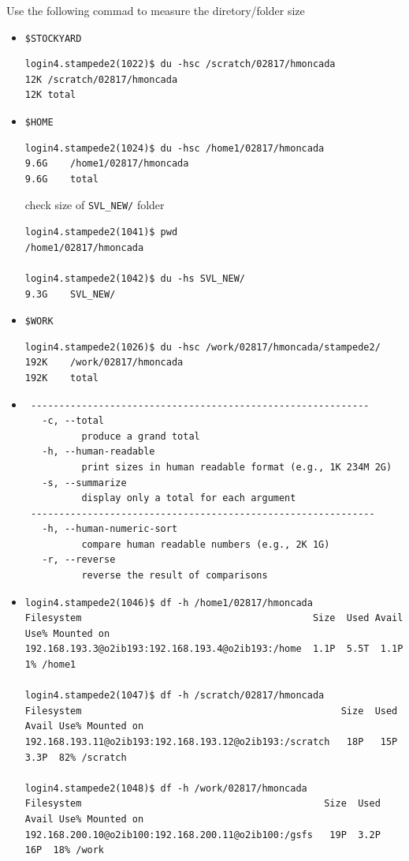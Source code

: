 \documentclass{article}
\begin{document}
Use the following commad to measure the diretory/folder size
\begin{itemize}
\item \verb+$STOCKYARD+
\begin{verbatim}
login4.stampede2(1022)$ du -hsc /scratch/02817/hmoncada
12K	/scratch/02817/hmoncada
12K	total 
\end{verbatim}
\item \verb+$HOME+
\begin{verbatim}
login4.stampede2(1024)$ du -hsc /home1/02817/hmoncada
9.6G	/home1/02817/hmoncada
9.6G	total 
\end{verbatim}
check size of \verb+SVL_NEW/+ folder
\begin{verbatim}
login4.stampede2(1041)$ pwd
/home1/02817/hmoncada

login4.stampede2(1042)$ du -hs SVL_NEW/
9.3G	SVL_NEW/
\end{verbatim}
\item \verb+$WORK+
\begin{verbatim}
login4.stampede2(1026)$ du -hsc /work/02817/hmoncada/stampede2/
192K	/work/02817/hmoncada
192K	total
\end{verbatim}
\item 
\begin{verbatim}
 ------------------------------------------------------------
   -c, --total
          produce a grand total
   -h, --human-readable
          print sizes in human readable format (e.g., 1K 234M 2G)
   -s, --summarize
          display only a total for each argument
 -------------------------------------------------------------
   -h, --human-numeric-sort
          compare human readable numbers (e.g., 2K 1G)
   -r, --reverse
          reverse the result of comparisons 
\end{verbatim}
\item 
\begin{verbatim}
login4.stampede2(1046)$ df -h /home1/02817/hmoncada
Filesystem                                         Size  Used Avail Use% Mounted on
192.168.193.3@o2ib193:192.168.193.4@o2ib193:/home  1.1P  5.5T  1.1P   1% /home1

login4.stampede2(1047)$ df -h /scratch/02817/hmoncada
Filesystem                                              Size  Used Avail Use% Mounted on
192.168.193.11@o2ib193:192.168.193.12@o2ib193:/scratch   18P   15P  3.3P  82% /scratch

login4.stampede2(1048)$ df -h /work/02817/hmoncada
Filesystem                                           Size  Used Avail Use% Mounted on
192.168.200.10@o2ib100:192.168.200.11@o2ib100:/gsfs   19P  3.2P   16P  18% /work 
\end{verbatim}
\end{itemize}
\end{document}

